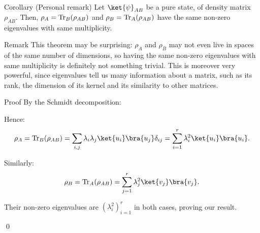 \documentclass[a4paper]{article}
\begin{document}
\begin{parag}{Corollary (Personal remark)}
    Let $\ket{\psi}_{AB}$ be a pure state, of density matrix $\rho_{AB}$. Then, $\rho_A = \Tr_B\left(\rho_{AB}\right)$ and $\rho_B = \Tr_A\left(\rho_{AB}\right)$ have the same non-zero eigenvalues with same multiplicity.

    \begin{subparag}{Remark}
        This theorem may be surprising: $\rho_A$ and $\rho_B$ may not even live in spaces of the same number of dimensions, so having the same non-zero eigenvalues with same multiplicity is definitely not something trivial. This is moreover very powerful, since eigenvalues tell us many information about a matrix, such as its rank, the dimension of its kernel and its similarity to other matrices.
    \end{subparag}

    \begin{subparag}{Proof}
        By the Schmidt decomposition: 

        Hence: 
        \[\rho_A = \Tr_B\left(\rho_{AB}\right) = \sum_{i, j} \lambda_i \lambda_j \ket{u_i}\bra{u_j} \delta_{ij} = \sum_{i=1}^{r} \lambda_i^2 \ket{u_i}\bra{u_i}.\]
        
        Similarly: 
        \[\rho_B = \Tr_A\left(\rho_{AB}\right) = \sum_{j=1}^r \lambda_j^2 \ket{v_j}\bra{v_j}.\]
        
        Their non-zero eigenvalues are $\left(\lambda_i^2\right)_{i=1}^r$ in both cases, proving our result.

        \qed
    \end{subparag}
\end{parag}
\end{document}
